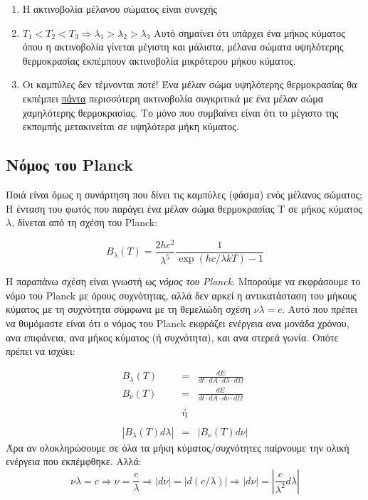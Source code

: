\begin{enumerate}
    \item Η ακτινοβολία μέλανου σώματος είναι συνεχής
    \item $T_1 < T_2 < T_3 \Rightarrow \lambda_1 > \lambda_2 > \lambda_3$
    Αυτό σημαίνει ότι υπάρχει ένα μήκος κύματος όπου η ακτινοβολία γίνεται μέγιστη και μάλιστα,  μέλανα σώματα υψηλότερης θερμοκρασίας εκπέμπουν ακτινοβολία μικρότερου μήκου κύματος.
    \item {\color{red} Οι καμπύλες δεν τέμνονται ποτέ!} Ένα μέλαν σώμα υψηλότερης θερμοκρασίας θα εκπέμπει \underline{πάντα} περισσότερη ακτινοβολία συγκριτικά με ένα μέλαν σώμα χαμηλότερης θερμοκρασίας. Το μόνο που συμβαίνει είναι ότι το μέγιστο της εκπομπής μετακινείται σε υψηλότερα μήκη κύματος.
\end{enumerate}

\subsection{Νόμος του Planck}
Ποιά είναι όμως η συνάρτηση που δίνει τις καμπύλες (φάσμα) ενός μέλανος σώματος;
Η ένταση του φωτός που παράγει ένα μέλαν σώμα θερμοκρασίας Τ σε μήκος κύματος $\lambda$, δίνεται από τη σχέση του Planck:

\begin{equation}
    \label{eq:planck_function_lambda}
    B_{\lambda}(T) = \frac{2hc^2}{\lambda^5} \frac{1}{\exp(hc/\lambda kT) - 1}
\end{equation}

Η παραπάνω σχέση είναι γνωστή ως \textit{νόμος του Planck}. Μπορούμε να εκφράσουμε το νόμο του Planck με όρους συχνότητας, αλλά δεν αρκεί η αντικατάσταση του μήκους κύματος με τη συχνότητα σύμφωνα με τη θεμελιώδη σχέση $\nu \lambda = c$. Αυτό που πρέπει να θυμόμαστε είναι ότι {\color{blue} ο νόμος του Planck εκφράζει ενέργεια ανα μονάδα χρόνου, ανα επιφάνεια, ανα μήκος κύματος (ή συχνότητα), και ανα στερεά γωνία}. Οπότε πρέπει να ισχύει:

\begin{eqnarray*}
    B_{\lambda} (T) &=& \frac{dE}{dt \cdot dA \cdot d \lambda \cdot d \Omega} \\ 
    B_{\nu} (T) &=& \frac{dE}{dt \cdot dA \cdot d \nu \cdot d \Omega} \\\\
    &\text{ή}& \\\\
    |B_{\lambda} (T) d \lambda | &=& |B_{\nu} (T) d \nu |
\end{eqnarray*}
Άρα αν ολοκληρώσουμε σε όλα τα μήκη κύματος/συχνότητες παίρνουμε την ολική ενέργεια που εκπέμφθηκε. Αλλά: $$\nu \lambda = c \Rightarrow \nu = \frac{c}{\lambda} \Rightarrow |d\nu | = | d \left( c / \lambda \right) | \Rightarrow | d\nu | = \left | \frac{c}{\lambda^2}d\lambda \right |$$

